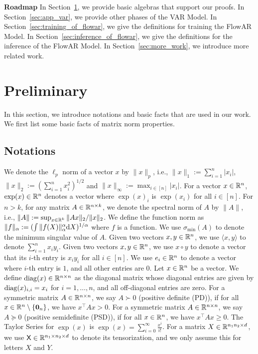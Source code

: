 {\bf Roadmap} In Section~\ref{sec:app_prelim}, we provide basic algebras that support our proofs. 
In Section~\ref{sec:app_var}, we provide other phases of the VAR Model. 
In Section~\ref{sec:training_of_flowar}, we give the definitions for training the FlowAR Model. 
In Section~\ref{sec:inference_of_flowar}, we give the definitions for the inference of the FlowAR Model.
In Section~\ref{sec:more_work}, we introduce more related work.

\section{Preliminary}\label{sec:app_prelim}

In this section, we introduce notations and basic facts that are used in our work. We first list some basic facts of matrix norm properties.

\subsection{Notations}
We denote the $\ell_p$ norm of a vector $x$ by $\| x \|_p$, i.e., $\|x\|_1 := \sum_{i=1}^n |x_i|$, $\| x \|_2 := (\sum_{i=1}^n x_i^2)^{1/2}$ and $\| x \|_{\infty} := \max_{i \in [n]} |x_i|$. For a vector $x \in \mathbb{R}^n$, $\exp(x) \in \mathbb{R}^n$ denotes a vector where $\exp(x)_i$ is $\exp(x_i)$ for all $i \in [n]$. For $n > k$, for any matrix $A \in \mathbb{R}^{n\times k}$, we denote the spectral norm of $A$ by $\| A \|$, i.e., $\| A \| := \sup_{x\in \mathbb{R}^k} \| Ax \|_2 / \| x \|_2$. We define the function norm as $\| f \|_\alpha :=  (\int \| f(X) \|_\alpha^\alpha \mathrm{d} X)^{1/\alpha}$ where $f$ is a function. We use $\sigma_{\min}(A)$ to denote the minimum singular value of $A$. Given two vectors $x, y \in \mathbb{R}^n$, we use $\langle x, y \rangle$ to denote $\sum_{i=1}^n x_iy_i$. Given two vectors $x, y \in \mathbb{R}^n$, we use $x \circ y$ to denote a vector that its $i$-th entry is $x_i y_i$ for all $i \in [n]$. We use $e_i \in \mathbb{R}^n$ to denote a vector where $i$-th entry is $1$, and all other entries are $0$. Let $x \in \mathbb{R}^n$ be a vector. We define $\operatorname{diag} (x) \in \mathbb{R}^{n \times n}$ as the diagonal matrix whose diagonal entries are given by $\operatorname{diag}(x)_{i, i} = x_i$ for $i = 1, \dots, n$, and all off-diagonal entries are zero. For a symmetric matrix $A \in \mathbb{R}^{n\times n}$, we say $A \succ 0$ (positive definite (PD)), if for all $x\in \mathbb{R}^n \setminus \{ {\bf 0}_n \}$, we have $x^\top A x > 0$. For a symmetric matrix $A \in \mathbb{R}^{n \times n}$, we say $A \succeq 0$ (positive semidefinite (PSD)), if for all $x \in \mathbb{R}^n$, we have $x^\top A x \geq 0$. The Taylor Series for $\exp(x)$ is $\exp(x) = \sum_{i=0}^{\infty} \frac{x^i}{i!}$. For a matrix $X \in \mathbb{R}^{n_1 n_2 \times d}$, we use $\mathsf{X} \in \mathbb{R}^{n_1 \times n_2 \times d}$ to denote its tensorization, and we only assume this for letters $X$ and $Y$.

